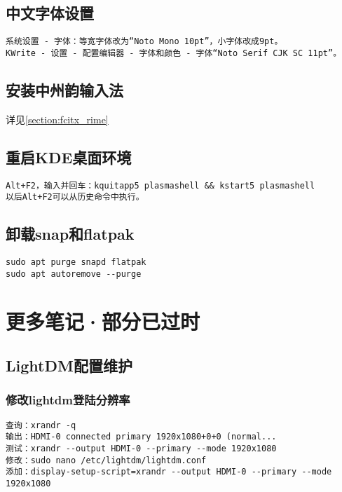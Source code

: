 \documentclass[a4paper,fontset=fandol,zihao=-4,linespread=1.2]{ctexbook}
\begin{document}
\section{中文字体设置}
\begin{lstlisting}
系统设置 - 字体：等宽字体改为“Noto Mono 10pt”，小字体改成9pt。
KWrite - 设置 - 配置编辑器 - 字体和颜色 - 字体“Noto Serif CJK SC 11pt”。
\end{lstlisting}

\section{安装中州韵输入法}
详见\ref{section:fcitx_rime}

\section{重启KDE桌面环境}
\begin{lstlisting}
Alt+F2，输入并回车：kquitapp5 plasmashell && kstart5 plasmashell
以后Alt+F2可以从历史命令中执行。
\end{lstlisting}

\section{卸载snap和flatpak}
\begin{lstlisting}
sudo apt purge snapd flatpak
sudo apt autoremove --purge
\end{lstlisting}


\chapter{更多笔记·部分已过时}

\section{LightDM配置维护}

\subsection{修改lightdm登陆分辨率}
\begin{lstlisting}
查询：xrandr -q
输出：HDMI-0 connected primary 1920x1080+0+0 (normal...
测试：xrandr --output HDMI-0 --primary --mode 1920x1080
修改：sudo nano /etc/lightdm/lightdm.conf
添加：display-setup-script=xrandr --output HDMI-0 --primary --mode 1920x1080
\end{lstlisting}
\end{document}
